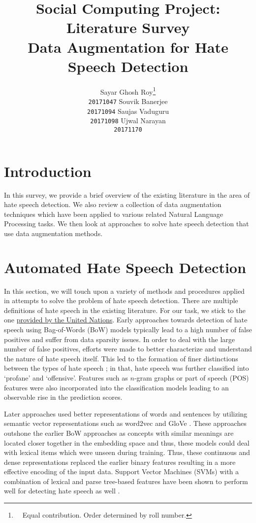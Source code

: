 \documentclass[11pt,a4paper]{article}
\title{{\small Social Computing Project: Literature Survey} \vspace{0.1cm} \\ Data Augmentation for Hate Speech Detection}
\author{Sayar Ghosh Roy\thanks{\ \ Equal contribution. Order determined by roll number.} \\ \texttt{20171047} \And
        Souvik Banerjee\footnotemark[1] \\ \texttt{20171094} \And
        Saujas Vaduguru\footnotemark[1] \\ \texttt{20171098} \And
        Ujwal Narayan\footnotemark[1] \\ \texttt{20171170}}
\date{}
\begin{document}
\maketitle

\section{Introduction}
In this survey, we provide a brief overview of the existing literature in the area of hate speech detection. We also review a collection of data augmentation techniques which have been applied to various related Natural Language Processing tasks. We then look at approaches to solve hate speech detection that use data augmentation methods.

\section{Automated Hate Speech Detection}
In this section, we will touch upon a variety of methods and procedures applied in attempts to solve the problem of hate speech detection. There are multiple definitions of hate speech in the existing literature. For our task, we stick to the one \href{https://www.un.org/en/genocideprevention/documents/UN Strategy and Plan of Action on Hate Speech 18 June SYNOPSIS.pdf}{provided by the United Nations}. Early approaches towards detection of hate speech using Bag-of-Words (BoW) models \cite{Kwok2013LocateTH} typically lead to a high number of false positives and suffer from data sparsity issues. In order to deal with the large number of false positives, efforts were made to better characterize and understand the nature of hate speech itself. This led to the formation of finer distinctions between the types of hate speech \cite{wang2014cursing}; in that, hate speech was further classified into `profane' and `offensive'. Features such as $n$-gram graphs \cite{phdthesis} or part of speech (POS) features \cite{chen2012detecting} were also incorporated into the classification models leading to an observable rise in the prediction scores. 

Later approaches used better representations of words and sentences by utilizing semantic vector representations such as word2vec \cite{mikolov2013distributed} and GloVe \cite{pennington2014glove}. These approaches outshone the earlier BoW approaches as concepts with similar meanings are located closer together in the embedding space and thus, these models could deal with lexical items which were unseen during training. Thus, these continuous and dense representations replaced the earlier binary features resulting in a more effective encoding of the input data. Support Vector Machines (SVMs) with a combination of lexical and parse tree-based features have been shown to perform well for detecting hate speech as well \cite{chen2012detecting}.
\end{document}
